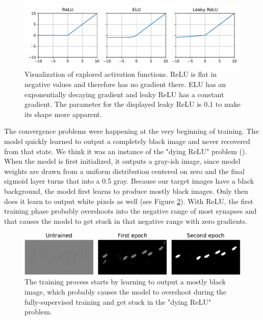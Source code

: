 \begin{figure}[ht]
    \centering
    \includegraphics[width=140mm]{../../figures/03-activation-function/functions.pdf}
    \caption{Visualization of explored activation functions. ReLU is flat in negative values and therefore has no gradient there. ELU has an exponentially decaying gradient and leaky ReLU has a constant gradient. The parameter for the displayed leaky ReLU is 0.1 to make its shape more apparent.}
    \label{fig:ActivationFunctions}
\end{figure}

The convergence problems were happening at the very beginning of training. The model quickly learned to output a completely black image and never recovered from that state. We think it was an instance of the "dying ReLU" problem (\cite{DyingRelu}). When the model is first initialized, it outputs a gray-ish image, since model weights are drawn from a uniform distribution centered on zero and the final sigmoid layer turns that into a 0.5 gray. Because our target images have a black background, the model first learns to produce mostly black images. Only then does it learn to output white pixels as well (see Figure \ref{fig:ActivationTrainingProgression}). With ReLU, the first training phase probably overshoots into the negative range of most synapses and that causes the model to get stuck in that negative range with zero gradients.

\begin{figure}[ht]
    \centering
    \includegraphics[width=145mm]{../../figures/03-activation-function/progression.pdf}
    \caption{The training process starts by learning to output a mostly black image, which probably causes the model to overshoot during the fully-supervised training and get stuck in the "dying ReLU" problem.}
    \label{fig:ActivationTrainingProgression}
\end{figure}

